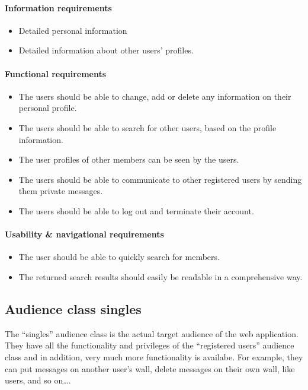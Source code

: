 \documentclass[11pt, a4paper,svglistings,oneside]{book}
\begin{document}
\paragraph{Information requirements}

\begin{itemize}
\item Detailed personal information 
\item Detailed information about other users' profiles.
\end{itemize}

\paragraph{Functional requirements}

\begin{itemize}
\item The users should be able to change, add or delete any information on their personal profile.
\item The users should be able to search for other users, based on the profile information.
\item The user profiles of other members can be seen by the users.
\item The users should be able to communicate to other registered users by sending them private messages.
\item The users should be able to log out and terminate their account.
\end{itemize}

\paragraph{Usability \& navigational requirements}

\begin{itemize}
\item The user should be able to quickly search for members.
\item The returned search results should easily be readable in a comprehensive way.
\end{itemize}

\subsection{Audience class singles}
\label{sec:singlesclass}
The ``singles'' audience class is the actual target audience of the web application. They have all the functionality and privileges of the ``registered users'' audience class and in addition, very much more functionality is availabe. For example, they can put messages on another user's wall, delete messages on their own wall, like users, and so on\ldots.\\
\end{document}
